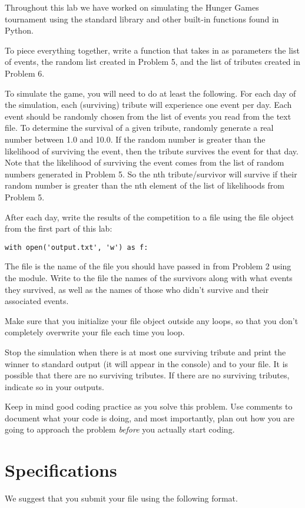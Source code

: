 \begin{problem}
Throughout this lab we have worked on simulating the Hunger Games tournament using the standard library and other built-in functions found in Python.

To piece everything together, write a function that takes in as parameters the list of events, the random list created in Problem 5, and the list of tributes created in Problem 6.

To simulate the game, you will need to do at least the following.
For each day of the simulation, each (surviving) tribute will experience one event per day. Each event should be randomly chosen from the list of events you read from the text file.
To determine the survival of a given tribute, randomly generate a real number between 1.0 and 10.0. 
If the random number is greater than the likelihood of surviving the event, then the tribute survives the event for that day. Note that the likelihood of surviving the event comes from the list of random numbers generated in Problem 5. So the nth tribute/survivor will survive if their random number is greater than the nth element of the list of likelihoods from Problem 5.

After each day, write the results of the competition to a file using the file object from the first part of this lab:

\begin{lstlisting}
with open('output.txt', 'w') as f:
\end{lstlisting}

The file  is the name of the file you should have passed in from Problem 2 using the  module. Write to the file the names of the survivors along with what events they survived, as well as the names of those who didn't survive and their associated events.

Make sure that you initialize your file object outside any loops, so that you don't completely overwrite your file each time you loop.

Stop the simulation when there is at most one surviving tribute and print the winner to standard output (it will appear in the console) and to your file.  It is possible that there are no surviving tributes.  If there are no surviving tributes, indicate so in your outputs.

Keep in mind good coding practice as you solve this problem. Use comments to document what your code is doing, and most importantly, plan out how you are going to approach the problem \emph{before} you actually start coding. 

\end{problem}

\section*{Specifications}
We suggest that you submit your  file using the following format.





